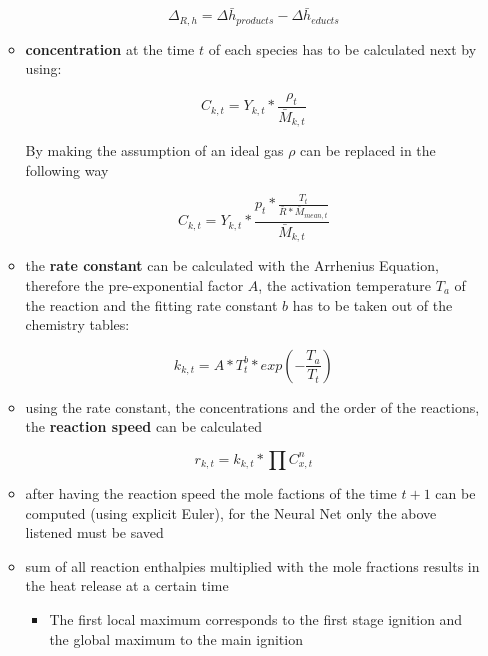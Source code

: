 \documentclass[12pt,oneside,a4paper,english]{article}
\begin{document}
\begin{itemize}
\begin{itemize}
{	\begin{equation}
	\Delta_{R,h} = \Delta \bar{h}_{products} - \Delta \bar{h}_{educts} 
	\end{equation}}
	
	\item{\textbf{concentration} at the time $t$ of each species has to be calculated next by using: 
	
	\begin{equation}
	C_{k,t} = Y_{k,t} * \frac{\rho_t}{\bar{M}_{k,t}}
	\end{equation}
	
	By making the assumption of an ideal gas $\rho$ can be replaced in the following way
	
	\begin{equation}
	C_{k,t} = Y_{k,t} * \frac{p_t*\frac{T_t}{\bar{R}*\bar{M}_{mean,t}}}{\bar{M}_{k,t}}
	\end{equation}}
	
	\item{the \textbf{rate constant} can be calculated with the Arrhenius Equation, therefore the pre-exponential factor $A$, the activation temperature $T_a$ of the reaction and the fitting rate constant $b$ has to be taken out of the chemistry tables:
	
	\begin{equation}
	k_{k,t} = A*T_t^b* exp(-\frac{T_a}{T_t})
	\end{equation}}
	
	\item{using the rate constant, the concentrations and the order of the reactions, the \textbf{reaction speed} can be calculated
	
	\begin{equation}
	r_{k,t} = k_{k,t}* \prod C_{x,t}^n 
	\end{equation}}
	
	\item{after having the reaction speed the mole factions of the time $t+1$ can be computed (using explicit Euler), for the Neural Net only the above listened must be saved}
	
	\item{sum of all reaction enthalpies multiplied with the mole fractions results in the heat release at a certain time}
	
		\begin{itemize}
		\item{The first local maximum corresponds to the first stage ignition and the global maximum to the main ignition}
		\end{itemize}
		
	\end{itemize}
	
\end{itemize}


\label{EndOfText}

\newpage %





\thispagestyle{fancy}

\label{endOfDoc}
\end{document}
